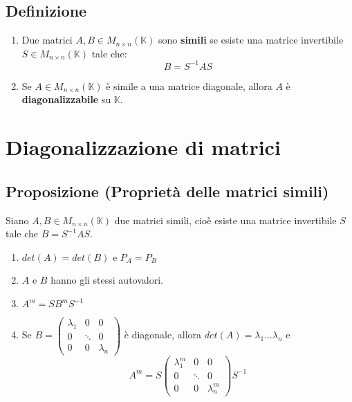 \documentclass[a4paper]{article}
\theoremstyle{break}
\theoremstyle{break}
\theoremstyle{break}
\theoremstyle{break}
\begin{document}
\subsection{Definizione}
\begin{enumerate}
  \item Due matrici \( A,B \in M_{n \times n}(\mathbb{K}) \) sono \textbf{simili} se
    esiste una matrice invertibile \( S \in M_{n \times n}(\mathbb{K}) \) tale che:
    \[
    B = S^{-1}AS
    \] 

  \item Se \( A \in  M_{n \times n}(\mathbb{K}) \) è simile a una matrice diagonale,
    allora \( A \) è \textbf{diagonalizzabile} su \( \mathbb{K} \).
\end{enumerate}


\section{Diagonalizzazione di matrici}

\subsection{Proposizione (Proprietà delle matrici simili)}
Siano \( A,B \in M_{n \times n}(\mathbb{K}) \) due matrici simili, cioè esiste una matrice
invertibile \( S \) tale che \( B = S^{-1}AS \).
\begin{enumerate}
  \item \( det(A) = det(B) \) e \( P_A = P_B \) 
  \item \( A \) e \( B \) hanno gli stessi autovalori.
  \item \( A^m = SB^mS^{-1} \) 
  \item Se
    \(
    B = \begin{pmatrix} 
      \lambda_1 & 0 & 0\\
      0 & \ddots & 0\\
      0 & 0 & \lambda_n
    \end{pmatrix} 
    \) 
    è diagonale, allora
    \(
    det(A) = \lambda_1 \ldots \lambda_n
    \) 
    e
    \[
    A^m = S \begin{pmatrix} 
      \lambda_1^m & 0 & 0\\
      0 & \ddots & 0\\
      0 & 0 & \lambda_n^m
    \end{pmatrix} 
    S^{-1}
    \] 
\end{enumerate}
\end{document}
